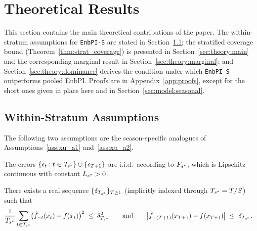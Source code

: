 \section{Theoretical Results}
\label{sec:theory}

This section contains the main theoretical contributions of the
paper.  The within-stratum assumptions for \texttt{EnbPI-S} are
stated in Section~\ref{sec:theory:assumptions}; the stratified
coverage bound (Theorem~\ref{thm:strat_coverage}) is presented in
Section~\ref{sec:theory:main} and the corresponding marginal result
in Section~\ref{sec:theory:marginal}; and
Section~\ref{sec:theory:dominance} derives the condition under which
\texttt{EnbPI-S} outperforms pooled EnbPI.  Proofs are in
Appendix~\ref{app:proofs}, except for the short ones given in place
here and in Section~\ref{sec:model:seasonal}.

\subsection{Within-Stratum Assumptions}
\label{sec:theory:assumptions}

The following two assumptions are the season-specific analogues
of Assumptions~\ref{ass:xu_a1} and~\ref{ass:xu_a2}.

\begin{assumption}
\label{ass:strat_a1}
The errors
$\{\epsilon_t : t \in \mathcal{T}_{s^*}\} \cup \{\epsilon_{T+1}\}$
are i.i.d.\ according to $F_{s^*}$, which is Lipschitz
continuous with constant $L_{s^*} > 0$.
\end{assumption}

\begin{assumption}
\label{ass:strat_a2}
There exists a real sequence $\{\delta_{T_{s^*}}\}_{T \geq 1}$
(implicitly indexed through $T_{s^*} = T/S$) such that
\begin{equation}
  \label{eq:strat_a2}
  \frac{1}{T_{s^*}}
  \sum_{t \in \mathcal{T}_{s^*}}
  \bigl(\hat{f}_{-t}(x_t) - f(x_t)\bigr)^2
  \;\leq\; \delta_{T_{s^*}}^2
  \qquad\text{and}\qquad
  \bigl|\hat{f}_{-(T+1)}(x_{T+1}) - f(x_{T+1})\bigr|
  \;\leq\; \delta_{T_{s^*}}.
\end{equation}
\end{assumption}

